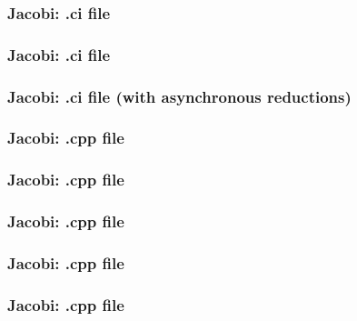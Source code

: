 \begin{frame}[fragile]
  \frametitle{Jacobi: .ci file}
  
\end{frame}

\begin{frame}[fragile]
  \frametitle{Jacobi: .ci file}
  
\end{frame}

\begin{frame}[fragile]
  \frametitle{Jacobi: .ci file (with \textbf{asynchronous} reductions)}
  
\end{frame}

\begin{frame}[fragile]
  \frametitle{Jacobi: .cpp file}
  
\end{frame}

\begin{frame}[fragile]
  \frametitle{Jacobi: .cpp file}
  
\end{frame}

\begin{frame}[fragile]
  \frametitle{Jacobi: .cpp file}
  
\end{frame}

\begin{frame}[fragile]
  \frametitle{Jacobi: .cpp file}
  
\end{frame}

\begin{frame}[fragile]
  \frametitle{Jacobi: .cpp file}
  
\end{frame}
